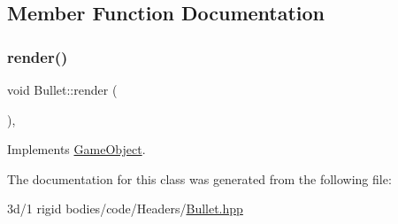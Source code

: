 \subsection{Member Function Documentation}
\mbox{\label{class_bullet_a4b58c9ddf90ecd78b2e5b292c7496850}} 
\subsubsection{\texorpdfstring{render()}{render()}}
{\footnotesize\ttfamily void Bullet\+::render (\begin{DoxyParamCaption}{ }\end{DoxyParamCaption})\hspace{0.3cm}{\ttfamily [override]}, {\ttfamily [virtual]}}



Implements \mbox{\hyperlink{class_game_object_adee58d508cfa907162d1192a25dc21b9}{Game\+Object}}.



The documentation for this class was generated from the following file\+:\begin{DoxyCompactItemize}
\item 
3d/1 rigid bodies/code/\+Headers/\mbox{\hyperlink{_bullet_8hpp}{Bullet.\+hpp}}\end{DoxyCompactItemize}
